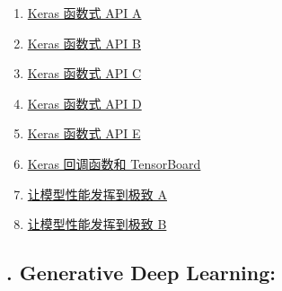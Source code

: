 \documentclass[11pt]{article}
\begin{document}
\vspace{-0.5cm}

\begin{multicols}{2}
	\begin{enumerate}
		\item \href{https://mp.weixin.qq.com/s/_3qS-f0kuwUrp4FB7Hq4bw}{Keras 函数式 API A}	%
		\item \href{https://mp.weixin.qq.com/s/Qj34FpFW5BFu4VFWFAeiuA}{Keras 函数式 API B}	%
		\item \href{https://mp.weixin.qq.com/s/ZBffdIjVB_do0OF4YeFe5w}{Keras 函数式 API C}	%
		\item \href{https://mp.weixin.qq.com/s/JFSLNwHzcHUdy6yINxqK9Q}{Keras 函数式 API D}	%
		\item \href{https://mp.weixin.qq.com/s/dvxgaTzrezdvjcmlR9xyEA}{Keras 函数式 API E}	%
		\item \href{https://mp.weixin.qq.com/s/_K7lauHbNRLcl4FFTn-yVg}{Keras 回调函数和 TensorBoard}	%
		\item \href{https://mp.weixin.qq.com/s/bY6w6AfW-kD-2Lxltov3PQ}{让模型性能发挥到极致 A}	%
		\item \href{https://mp.weixin.qq.com/s/JyhKWlqfcbKHP7v26-KRqA}{让模型性能发挥到极致 B}	%
	\end{enumerate}
\end{multicols}

\subsection*{\small {}. Generative Deep Learning:}

\vspace{-0.5cm}
\end{document}
